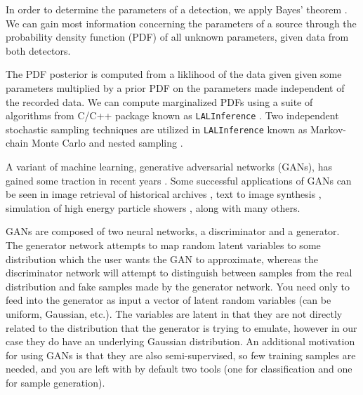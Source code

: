 \documentclass[%
showpacs,
 amsmath,amssymb,
 aps,
 twocolumn,
 prl,
 reprint,
floatfix,
]{revtex4-1}
\begin{document}
%
%
In order to determine the parameters of a detection, we apply Bayes' theorem \cite{Bayes and R. Price, Phil. Trans. R. Soc. London 53, 370 (1763). E. T. Jaynes, Probability Theory: The Logic of Science, edited by G. L. Bretthorst (Cambridge University Press, Cambridge, England, 2003).}. We can gain most information concerning the parameters of a source through the probability density function (PDF) of all unknown parameters, given data from both detectors. 

The PDF posterior is computed from a liklihood of the data given given some parameters multiplied by a prior PDF on  the parameters made independent of the recorded data. We can compute marginalized PDFs using a suite of algorithms from C/C++ package known as \texttt{LALInference} \cite{LALSuite}. Two independent stochastic sampling techniques are utilized in \texttt{LALInference} known as Markov-chain Monte Carlo \cite{MCMC paper} and nested sampling \cite{nested sampling}. 

   

%
%
A variant of machine learning, generative adversarial networks (GANs), has gained some traction in recent years \cite{arxiv:1406.2661}. Some successful applications of GANs can be seen in image retrieval of historical archives \cite{arxiv:1607.02748}, text to image synthesis \cite{arxiv:1605.05396}, simulation of high energy particle showers \cite{arxiv:1712.10321}, along with many others. 

GANs are composed of two neural networks, a discriminator and a generator. The generator network attempts to map random latent variables to some distribution which the user wants the GAN to approximate, whereas the discriminator network will attempt to distinguish between samples from the real distribution and fake samples made by the generator network. You need only to feed into the generator as input a vector of latent random variables (can be uniform, Gaussian, etc.). The variables are latent in that they are not directly related to the distribution that the generator is trying to emulate, however in our case they do have an underlying Gaussian distribution. An additional motivation for using GANs is that they are also semi-supervised, so few training samples are needed, and you are left with by default two tools (one for classification and one for sample generation).  
\end{document}
